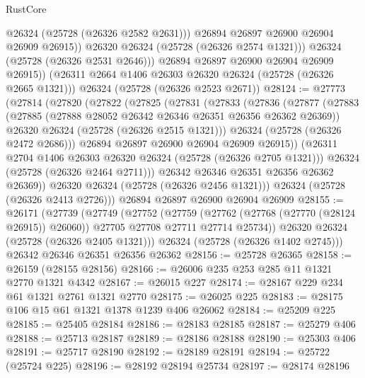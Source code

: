 \begin{lexlean}{RustCore}
\begin{coremodule}
                  @26324
                  (@25728 (@26326 @2582 @2631)))
                @26894
                @26897
                @26900
                @26904
                @26909
                @26915))
            @26320
            @26324
            (@25728 (@26326 @2574 @1321)))
          @26324
          (@25728 (@26326 @2531 @2646)))
        @26894
        @26897
        @26900
        @26904
        @26909
        @26915))
    (@26311 @2664 @1406 @26303 @26320 @26324 (@25728 (@26326 @2665 @1321)))
    @26324
    (@25728 (@26326 @2523 @2671))
@28124 := @27773
    (@27814
      (@27820
        (@27822
          (@27825
            (@27831
              (@27833
                (@27836
                  (@27877
                    (@27883
                      (@27885 (@27888 @28052 @26342 @26346 @26351 @26356 @26362 @26369))
                      @26320
                      @26324
                      (@25728 (@26326 @2515 @1321)))
                    @26324
                    (@25728 (@26326 @2472 @2686)))
                  @26894
                  @26897
                  @26900
                  @26904
                  @26909
                  @26915))
              (@26311 @2704 @1406 @26303 @26320 @26324 (@25728 (@26326 @2705 @1321)))
              @26324
              (@25728 (@26326 @2464 @2711)))
            @26342
            @26346
            @26351
            @26356
            @26362
            @26369))
        @26320
        @26324
        (@25728 (@26326 @2456 @1321)))
      @26324
      (@25728 (@26326 @2413 @2726)))
    @26894
    @26897
    @26900
    @26904
    @26909
@28155 := @26171
    (@27739
      (@27749
        (@27752
          (@27759
            (@27762 (@27768 (@27770 (@28124 @26915)) @26060))
            @27705
            @27708
            @27711
            @27714
            @25734))
        @26320
        @26324
        (@25728 (@26326 @2405 @1321)))
      @26324
      (@25728 (@26326 @1402 @2745)))
    @26342
    @26346
    @26351
    @26356
    @26362
@28156 := @25728 @26365
@28158 := @26159 (@28155 @28156)
@28166 := @26006 @235 @253 @285 @11 @1321 @2770 @1321 @4342
@28167 := @26015 @227
@28174 := @28167 @229 @234 @61 @1321 @2761 @1321 @2770
@28175 := @26025 @225
@28183 := @28175 @106 @15 @61 @1321 @1378 @1239 @406 @26062
@28184 := @25209 @225
@28185 := @25405 @28184
@28186 := @28183 @28185
@28187 := @25279 @406
@28188 := @25713 @28187
@28189 := @28186 @28188
@28190 := @25303 @406
@28191 := @25717 @28190
@28192 := @28189 @28191
@28194 := @25722 (@25724 @225)
@28196 := @28192 @28194 @25734
@28197 := @28174 @28196

\end{coremodule}
\end{lexlean}
